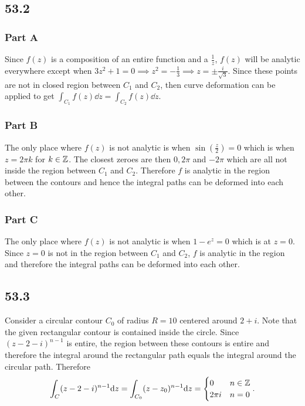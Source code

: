 \documentclass[12pt,titlepage]{extarticle}
\begin{document}
\subsection*{53.2}
\subsubsection*{Part A}
Since $f(z)$ is a composition of an entire function and a $\frac{1}{z}$, $f(z)$ will be analytic everywhere except when $3z^2 + 1 = 0 \implies z^2 = -\frac{1}{3} \implies z = \pm \frac{i}{\sqrt{3}}$. Since these points are not in closed region between $C_1$ and $C_2$, then curve deformation can be applied to get $\int_{C_1} f(z) \dd z = \int_{C_2} f(z) \dd z$.

\subsubsection*{Part B}
The only place where $f(z)$ is not analytic is when $\sin(\frac{z}{2}) = 0$ which is when $z = 2 \pi k$ for $k \in \mathbb{Z}$. The closest zeroes are then $0, 2 \pi$ and $-2 \pi$ which are all not inside the region between $C_1$ and $C_2$. Therefore $f$ is analytic in the region between the contours and hence the integral paths can be deformed into each other.


\subsubsection*{Part C}
The only place where $f(z)$ is not analytic is when $1 - e^{z} = 0$ which is at $z=0$. Since $z = 0$ is not in the region between $C_1$ and $C_2$, $f$ is analytic in the region and therefore the integral paths can be deformed into each other.

\subsection*{53.3}
Consider a circular contour $C_0$ of radius $R = 10$ centered around $2 + i$. Note that the given rectangular contour is contained inside the circle. Since $(z-2-i)^{n-1}$ is entire, the region between these contours is entire and therefore the integral around the rectangular path equals the integral around the circular path. Therefore
\[
    \int_C (z - 2 - i)^{n-1} \dd z = \int_{C_0} (z-z_0)^{n-1} \dd z = \begin{cases}
        0 & n \in \mathbb{Z} \\
        2 \pi i & n = 0
    \end{cases}
.\]
\end{document}
